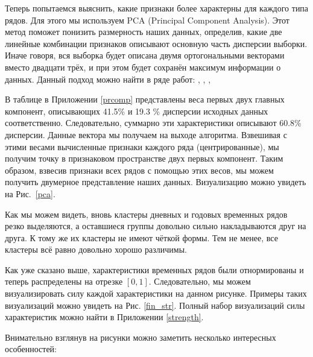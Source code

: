 \documentclass[a4paper,12pt]{article}
\begin{document}
	
	
	Теперь попытаемся выяснить, какие признаки более характерны для каждого типа рядов. Для этого мы используем PCA (Principal Component Analysis).  Этот метод поможет понизить размерность наших данных, определив, какие две линейные комбинации признаков описывают основную часть дисперсии выборки. Иначе говоря, вся выборка будет описана двумя ортогональными векторами вместо двадцати трёх, и при этом будет сохранён максимум информации о данных. Данный подход можно найти в ряде работ:  \cite{visual}, \cite{start}, \cite{pca},\cite{anomalous}
	
		
	

В таблице в Приложении \ref{prcomp} представлены веса первых двух главных компонент, описывающих 41.5\% и 19.3 \% дисперсии исходных данных соответственно. Следовательно, суммарно эти характеристики описывают 60.8\% дисперсии. Данные вектора мы получаем на выходе алгоритма. Взвешивая с этими весами вычисленные признаки каждого ряда (центрированные), мы получим точку в признаковом пространстве двух первых компонент. Таким образом, взвесив признаки всех рядов с помощью этих весов, мы можем получить двумерное представление наших данных. Визуализацию можно увидеть на Рис.~\ref{pca}.

Как мы можем видеть, вновь кластеры дневных и годовых временных рядов резко выделяются, а оставшиеся  группы довольно сильно накладываются друг на друга. К тому же их кластеры не имеют чёткой формы. Тем не менее, все кластеры всё равно довольно хорошо различимы. 

Как уже сказано выше, характеристики временных рядов были отнормированы и теперь распределены на отрезке $ [0, 1] $. Следовательно, мы можем визуализировать силу каждой характеристики на данном рисунке. Примеры таких визуализаций можно увидеть на Рис. \ref{fin_str}. Полный набор визуализаций силы характеристик можно найти в Приложении \ref{strength}.

Внимательно взглянув на рисунки можно заметить несколько интересных особенностей:
\end{document}
